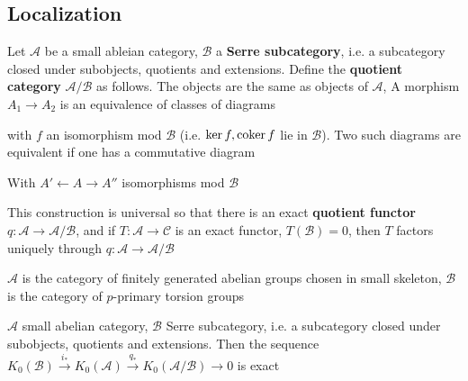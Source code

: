 \documentclass[main]{subfiles}
\begin{document}
\subsection{Localization}
Let $\mathscr A$ be a small ableian category, $\mathscr B$ a \textbf{Serre subcategory}, i.e. a subcategory closed under subobjects, quotients and extensions. Define the \textbf{quotient category} $\mathscr A/\mathscr B$ as follows. The objects are the same as objects of $\mathscr A$, A morphism $A_1\to A_2$ is an equivalence of classes of diagrams
\begin{center}
\end{center}
with $f$ an isomorphism mod $\mathscr B$ (i.e. $\ker f,\operatorname{coker} f$ lie in $\mathscr B$). Two such diagrams are equivalent if one has a commutative diagram
\begin{center}
\end{center}
With $A'\leftarrow A\rightarrow A''$ isomorphisms mod $\mathscr B$

This construction is universal so that there is an exact \textbf{quotient functor} $q:\mathscr A\to \mathscr A/\mathscr B$, and if $T:\mathscr A\to \mathscr C$ is an exact functor, $T(\mathscr B)=0$, then $T$ factors uniquely through $q:\mathscr A\to \mathscr A/\mathscr B$

\begin{example}
$\mathscr A$ is the category of finitely generated abelian groups chosen in small skeleton, $\mathscr B$ is the category of $p$-primary torsion groups
\end{example}

\begin{theorem}
$\mathscr A$ small abelian category, $\mathscr B$ Serre subcategory, i.e. a subcategory closed under subobjects, quotients and extensions. Then the sequence $K_0(\mathscr B)\xrightarrow{i_*} K_0(\mathscr A)\xrightarrow{q_*} K_0(\mathscr A/\mathscr B)\to0$ is exact
\end{theorem}
\end{document}
